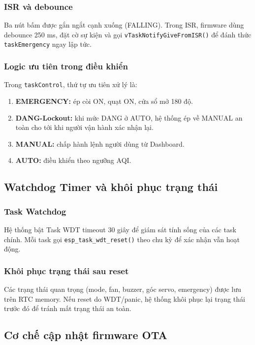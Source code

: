 \documentclass[../BTL_PTIT.tex]{subfiles}
\begin{document}
\subsubsection{ISR và debounce}
Ba nút bấm được gắn ngắt cạnh xuống (FALLING). Trong ISR, firmware dùng debounce 250 ms, đặt cờ sự kiện và gọi \texttt{vTaskNotifyGiveFromISR()} để đánh thức \texttt{taskEmergency} ngay lập tức.

\subsubsection{Logic ưu tiên trong điều khiển}
Trong \texttt{taskControl}, thứ tự ưu tiên xử lý là:
\begin{enumerate}[label=\arabic*.]
    \item \textbf{EMERGENCY:} ép còi ON, quạt ON, cửa sổ mở 180 độ.
    \item \textbf{DANG-Lockout:} khi mức DANG ở AUTO, hệ thống ép về MANUAL an toàn cho tới khi người vận hành xác nhận lại.
    \item \textbf{MANUAL:} chấp hành lệnh người dùng từ Dashboard.
    \item \textbf{AUTO:} điều khiển theo ngưỡng AQI.
\end{enumerate}

\subsection{Watchdog Timer và khôi phục trạng thái}

\subsubsection{Task Watchdog}
Hệ thống bật Task WDT timeout 30 giây để giám sát tính sống của các task chính. Mỗi task gọi \texttt{esp\_task\_wdt\_reset()} theo chu kỳ để xác nhận vẫn hoạt động.

\subsubsection{Khôi phục trạng thái sau reset}
Các trạng thái quan trọng (mode, fan, buzzer, góc servo, emergency) được lưu trên RTC memory. Nếu reset do WDT/panic, hệ thống khôi phục lại trạng thái trước đó để tránh mất trạng thái an toàn.

\subsection{Cơ chế cập nhật firmware OTA}
\end{document}
